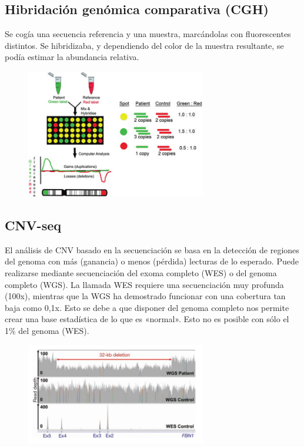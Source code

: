 \begin{itemize}
\subsection{Hibridación genómica comparativa (CGH)}
Se cogía una secuencia referencia y una muestra, marcándolas con fluorescentes distintos. Se hibridizaba, y dependiendo del color de la muestra resultante, se podía estimar la abundancia relativa. 

\begin{figure}[h!]
\centering
\includegraphics[width = 0.7\textwidth]{figs/Comparative-genome-hybridization-CGH-microarray-Karampetsou-et-al-2014.png}
\end{figure}

\subsection{CNV-seq}
El análisis de CNV basado en la secuenciación se basa en la detección de regiones del genoma con más (ganancia) o menos (pérdida) lecturas de lo esperado.
Puede realizarse mediante secuenciación del exoma completo (WES) o del genoma completo (WGS).
La llamada WES requiere una secuenciación muy profunda (100x), mientras que la WGS ha demostrado funcionar con una cobertura tan baja como 0,1x.
Esto se debe a que disponer del genoma completo nos permite crear una base estadística de lo que es «normal». Esto no es posible con sólo el 1\% del genoma (WES).

\begin{figure}[h!]
\centering
\includegraphics[width = 0.7\textwidth]{figs/cnv-calling-wgs.png}
\end{figure}


\end{itemize}
